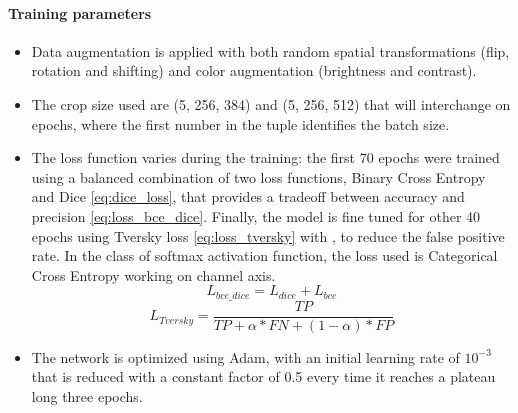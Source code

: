 \documentclass[10pt,twocolumn,letterpaper]{article}
\begin{document}
      \paragraph{Training parameters}
         \begin{itemize}
            \item Data augmentation is applied with both random spatial transformations (flip, rotation and shifting) and color augmentation (brightness and contrast).
            \item The crop size used are (5, 256, 384) and (5, 256, 512) that will interchange on epochs, where the first number in the tuple identifies the batch size.
            \item The loss function varies during the training: the first 70 epochs were trained using a balanced combination of two loss functions, Binary Cross Entropy and Dice \eqref{eq:dice_loss}, that provides a tradeoff between accuracy and precision \eqref{eq:loss_bce_dice}. Finally, the model is fine tuned for other 40 epochs using Tversky loss \eqref{eq:loss_tversky} with , to reduce the false positive rate. In the class of softmax activation function, the loss used is Categorical Cross Entropy working on channel axis.
            \begin{equation}\label{eq:loss_bce_dice}
               L_{bce\_dice} = L_{dice} + L_{bce}
            \end{equation}
            \begin{equation}\label{eq:loss_tversky}
               L_{Tversky} = \frac{TP}{TP + \alpha*FN + (1-\alpha)*FP}
            \end{equation}
            \item The network is optimized using Adam, with an initial learning rate of $ 10^{-3} $ that is reduced with a constant factor of 0.5 every time it reaches a plateau long three epochs.
         \end{itemize}
\end{document}
